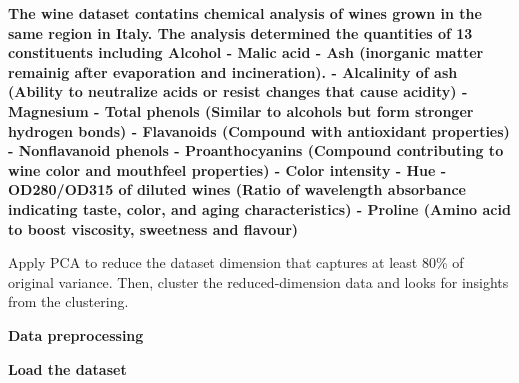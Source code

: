 \vspace{0.3em}
\begin{tcolorbox}[colback=gray!5!white,colframe=gray!50!black,boxrule=0.5pt,arc=2pt,left=4pt,right=4pt,top=2pt,bottom=2pt,unbreakable,before upper={\sloppy\raggedright}]
{\small\bfseries The wine dataset contatins chemical analysis of wines grown in the same region in Italy. The analysis determined the quantities of 13 constituents including
Alcohol
- Malic acid
- Ash (inorganic matter remainig after evaporation and incineration). 
- Alcalinity of ash (Ability to neutralize acids or resist changes that cause acidity)
- Magnesium
- Total phenols (Similar to alcohols but form stronger hydrogen bonds)
- Flavanoids (Compound with antioxidant properties)
- Nonflavanoid phenols
- Proanthocyanins (Compound contributing to wine color and mouthfeel properties)
- Color intensity
- Hue
- OD280/OD315 of diluted wines (Ratio of wavelength absorbance indicating taste, color, and aging characteristics)
- Proline (Amino acid to boost viscosity, sweetness and flavour) 

Apply PCA to reduce the dataset dimension that captures at least 80\% of original variance.  
Then, cluster the reduced-dimension data and looks for insights from the clustering.\par}
\end{tcolorbox}

\vspace{0.3em}
\begin{tcolorbox}[colback=gray!5!white,colframe=gray!50!black,boxrule=0.5pt,arc=2pt,left=4pt,right=4pt,top=2pt,bottom=2pt,unbreakable,before upper={\sloppy\raggedright}]
{\small\bfseries Data preprocessing\par}
\end{tcolorbox}

\vspace{0.3em}
\begin{tcolorbox}[colback=gray!5!white,colframe=gray!50!black,boxrule=0.5pt,arc=2pt,left=4pt,right=4pt,top=2pt,bottom=2pt,unbreakable,before upper={\sloppy\raggedright}]
{\small\bfseries Load the dataset\par}
\end{tcolorbox}

